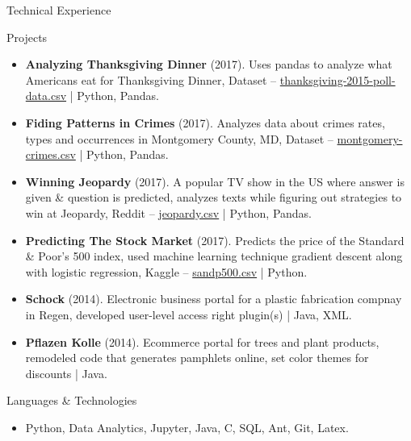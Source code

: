 \documentclass[]{mcdowellcv}
\begin{document}
	\begin{cvsection}{Technical Experience}
		\begin{cvsubsection}{Projects}{}{}
			\begin{itemize}
				\item \textbf{Analyzing Thanksgiving Dinner} (2017). Uses pandas to analyze what Americans eat for Thanksgiving Dinner, Dataset -- \href{https://fivethirtyeight.com/features/heres-what-your-part-of-america-eats-on-thanksgiving/}{thanksgiving-2015-poll-data.csv} | Python, Pandas.
				\item \textbf{Fiding Patterns in Crimes} (2017). Analyzes data about crimes rates, types and occurrences in Montgomery County, MD, Dataset -- \href{https://data.montgomerycountymd.gov/Public-Safety/Crime/icn6-v9z3}{montgomery-crimes.csv} | Python, Pandas.
				\item\textbf{Winning Jeopardy} (2017). A popular TV show in the US where answer is given \& question is predicted, analyzes texts while figuring out strategies to win at Jeopardy, Reddit -- \href{https://www.reddit.com/r/datasets/comments/1uyd0t/200000_jeopardy_questions_in_a_json_file/}{jeopardy.csv} | Python, Pandas.
				\item\textbf{Predicting The Stock Market} (2017). Predicts the price of the Standard \& Poor's 500 index, used machine learning technique gradient descent along with logistic regression, Kaggle -- \href{https://www.kaggle.com/camnugent/sandp500}{sandp500.csv} | Python.
				\item \textbf{Schock} (2014). Electronic business portal for a plastic fabrication compnay in Regen, developed user-level access right plugin(s) | Java, XML.
				\item \textbf{Pflazen Kolle} (2014).  Ecommerce portal for trees and plant products, remodeled code that generates pamphlets online, set color themes for discounts | Java.
			\end{itemize}
		\end{cvsubsection}
	\end{cvsection}
	\vspace*{-3mm}
	\begin{cvsection}{Languages \& Technologies}
		\begin{cvsubsection}{}{}{}	
			\begin{itemize}
				\item Python, Data Analytics, Jupyter, Java, C, SQL, Ant, Git, Latex.
			\end{itemize}
		\end{cvsubsection}
	\end{cvsection}
\end{document}
